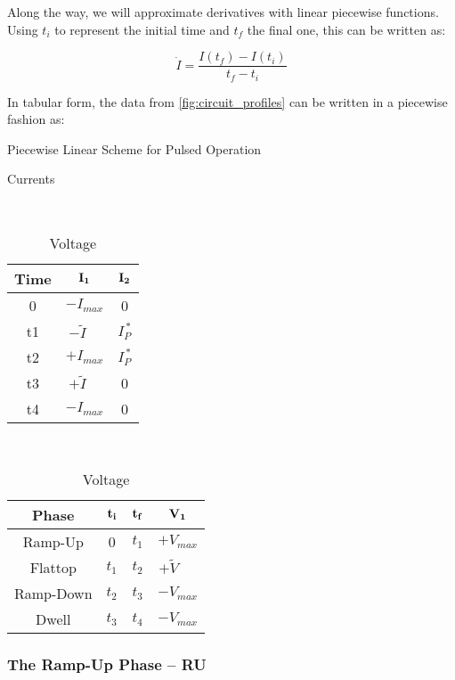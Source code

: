 Along the way, we will approximate derivatives with linear piecewise functions. Using $t_i$ to represent the initial time and $t_f$ the final one, this can be written as:

\begin{equation}
	\dot I = \frac{ I(t_f) - I(t_i) }{t_f - t_i}
\end{equation}

In tabular form, the data from \cref{fig:circuit_profiles} can be written in a piecewise fashion as:

\begin{table}[h!]
\centering	
\caption{Piecewise Linear Scheme for Pulsed Operation}
\hfill
\begin{subtable}[t]{0.4\textwidth}
\centering	
\caption{Currents} ~\\
\begin{tabular}{ c|c|c } 

\textbf{Time} & {$\bold{I_1}$} & {$\bold{I_2}$} \\
\hline
0 & $-I_{max}$ & 0 \\ 
t1 & $-\tilde I \ \ \ \,\, $ & $I_P^{\,*} $ \\ 
t2 & $+I_{max}$ & $I_P^{\,*}$ \\ 
t3 & $+\tilde I \ \ \ \,\, $ & 0 \\ 
t4 & $-I_{max}$ & 0 \\ 
\end{tabular}
\end{subtable}
\hfill
\begin{subtable}[t]{0.5\textwidth}
\centering	
\caption{Voltage} ~\\
\begin{tabular}{ c|c|c|c } 
\textbf{Phase} & $\bold{t_i}$ & $\bold{t_f}$ & $\bold{V_1}$ \\
\hline
Ramp-Up & 0 & $t_1$ & $+V_{max}$ \\ 
Flattop & $t_1$ & $t_2$ & $+ \tilde V$ \ \,\,\, \\ 
Ramp-Down & $t_2$ & $t_3$ & ${-V}_{max}$ \\ 
Dwell & $t_3$ & $t_4$ & ${-V}_{max}$ \\ 
\end{tabular}
\end{subtable}
\hfill
\hfill
\end{table}

\subsubsection{The Ramp-Up Phase -- RU}

